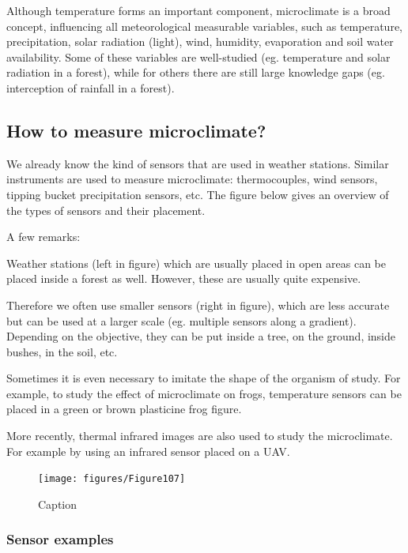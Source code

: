 \documentclass[12pt,oneside]{book}
\begin{document}
Although temperature forms an important component, microclimate is a
broad concept, influencing all meteorological measurable variables, such
as temperature, precipitation, solar radiation (light), wind, humidity,
evaporation and soil water availability. Some of these variables are
well-studied (eg. temperature and solar radiation in a forest), while
for others there are still large knowledge gaps (eg. interception of
rainfall in a forest).

\subsection{How to measure
microclimate?}\label{how-to-measure-microclimate}

We already know the kind of sensors that are used in weather stations.
Similar instruments are used to measure microclimate: thermocouples,
wind sensors, tipping bucket precipitation sensors, etc. The figure
below gives an overview of the types of sensors and their placement.

A few remarks:

Weather stations (left in figure) which are usually placed in open areas
can be placed inside a forest as well. However, these are usually quite
expensive.

Therefore we often use smaller sensors (right in figure), which are less
accurate but can be used at a larger scale (eg. multiple sensors along a
gradient). Depending on the objective, they can be put inside a tree, on
the ground, inside bushes, in the soil, etc.

Sometimes it is even necessary to imitate the shape of the organism of
study. For example, to study the effect of microclimate on frogs,
temperature sensors can be placed in a green or brown plasticine frog
figure.

More recently, thermal infrared images are also used to study the
microclimate. For example by using an infrared sensor placed on a UAV.

\begin{figure}

{\centering \texttt{[image: figures/Figure107]} 

}

\caption{Caption}\label{fig:Micro7}
\end{figure}

\subsubsection{Sensor examples}\label{sensor-examples}
\end{document}
